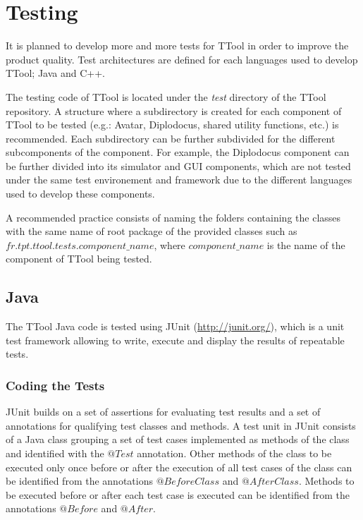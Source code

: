 \documentclass[12pt]{article}
\begin{document}
\section{Testing}

It is planned to develop more and more tests for TTool in order to improve the
product quality. Test architectures are defined for each languages used to
develop TTool; Java and C++.

The testing code of TTool is located under the \textit{test} directory of the TTool
repository. A structure where a subdirectory is created for each
component of TTool to be tested (e.g.: Avatar, Diplodocus, shared utility
functions, etc.) is recommended. Each subdirectory can be further subdivided for
the different subcomponents of the component. For example, the Diplodocus component can be
further divided into its simulator and GUI components, which are not tested
under the same test environement and framework due to the different languages
used to develop these components.

A recommended practice consists of naming the folders containing the classes
with the same name of root package of the provided classes such as
$fr.tpt.ttool.tests.component\_name$, where $component\_name$ is the name of the
component of TTool being tested.

\subsection{Java}

The TTool Java code is tested using JUnit (\url{http://junit.org/}), which is a
unit test framework allowing to write, execute and display the results of
repeatable tests.

\subsubsection{Coding the Tests}

JUnit builds on a set of assertions for evaluating test results
and a set of annotations for qualifying test classes and methods. A test unit in
JUnit consists of a Java class grouping a set of test cases implemented as
methods of the class and identified with the $@Test$ annotation.
Other methods of the class to be executed only once before or after the
execution of all test cases of the class can be identified from the annotations
$@BeforeClass$ and $@AfterClass$. Methods to be executed before or after each
test case is executed can be identified from the annotations $@Before$ and
$@After$.
\end{document}
